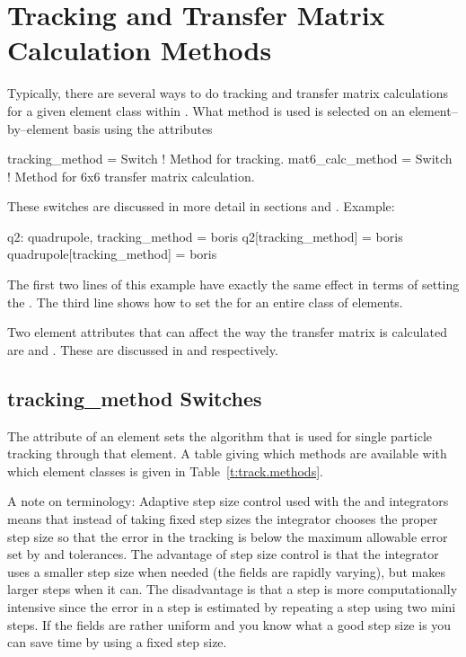 \chapter{Tracking and Transfer Matrix Calculation Methods}
\label{c:methods}

Typically, there are several ways to do tracking and transfer matrix
calculations for a given element class within \bmad. What method is
used is selected on an element--by--element basis using the attributes
\begin{example}
  tracking_method = Switch   ! Method for tracking.
  mat6_calc_method = Switch  ! Method for 6x6 transfer matrix calculation.
\end{example}
These switches are discussed in more detail in sections  
and . Example:
\begin{example}
  q2: quadrupole, tracking_method = boris
  q2[tracking_method] = boris
  quadrupole[tracking_method] = boris
\end{example}
The first two lines of this example have exactly the same effect in
terms of setting the . The third line shows how to
set the  for an entire class of elements.

Two element attributes that can affect the way the transfer matrix is
calculated are  and . These are
discussed in  and  respectively.

\section{tracking_method Switches}
\label{s:tkm}

The  attribute of an element sets the algorithm that is
used for single particle tracking through that element.
A table giving which methods are available with which element classes is
given in Table~\ref{t:track.methods}.

A note on terminology: Adaptive step size control used with the
 and  integrators means that 
instead of taking fixed step sizes the integrator chooses the proper
step size so that the error in the tracking is below the maximum
allowable error set by  and  tolerances. The
advantage of step size control is that the integrator uses a smaller
step size when needed (the fields are rapidly varying), but makes
larger steps when it can. The disadvantage is that a step is more
computationally intensive since the error in a step is estimated by
repeating a step using two mini steps. If the fields are rather
uniform and you know what a good step size is you can save time by using
a fixed step size.

